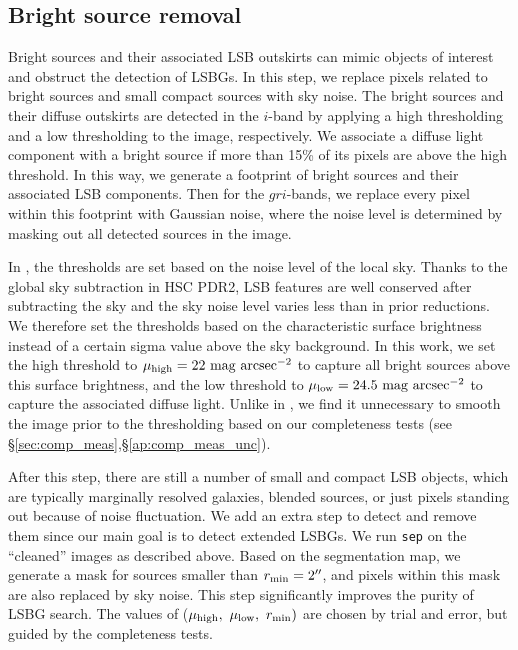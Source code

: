 \documentclass[twocolumn,astrosymb,twocolappendix]{aastex631}
\newcommand{\sbunit}{\mathrm{mag\ arcsec}^{-2}}
\newcommand{\code}[1]{\texttt{#1}}
\begin{document}
\begin{CJK*}{UTF8}{gbsn}
\subsection{Bright source removal}
Bright sources and their associated LSB outskirts can mimic objects of interest and obstruct the detection of LSBGs. In this step, we replace pixels related to bright sources and small compact sources with sky noise. The bright sources and their diffuse outskirts are detected in the $i$-band by applying a high thresholding and a low thresholding to the image, respectively. We associate a diffuse light component with a bright source if more than 15\% of its pixels are above the high threshold. In this way, we generate a footprint of bright sources and their associated LSB components. Then for the $gri$-bands, we replace every pixel within this footprint with Gaussian noise, where the noise level is determined by masking out all detected sources in the image. 
    
In , the thresholds are set based on the noise level of the local sky. Thanks to the global sky subtraction in HSC PDR2, LSB features are well conserved after subtracting the sky and the sky noise level varies less than in prior reductions. We therefore set the thresholds based on the characteristic surface brightness instead of a certain sigma value above the sky background. In this work, we set the high threshold to $\mu_{\rm high} = 22\ \sbunit$ to capture all bright sources above this surface brightness, and the low threshold to $\mu_{\rm low} = 24.5\ \sbunit$ to capture the associated diffuse light. Unlike in , we find it unnecessary to smooth the image prior to the thresholding based on our completeness tests (see \S \ref{sec:comp_meas},\S\ref{ap:comp_meas_unc}).   

After this step, there are still a number of small and compact LSB objects, which are typically marginally resolved galaxies, blended sources, or just pixels standing out because of noise fluctuation. We add an extra step to detect and remove them since our main goal is to detect extended LSBGs. We run \code{sep} on the ``cleaned'' images as described above. Based on the segmentation map, we generate a mask for sources smaller than $r_{\rm min} = 2\mbox{$^{\prime\prime}$}$, and pixels within this mask are also replaced by sky noise. This step significantly improves the purity of LSBG search. The values of ($\mu_{\rm high},\ \mu_{\rm low},\ r_{\rm min})$ are chosen by trial and error, but guided by the completeness tests. 
    

\end{CJK*}
\end{document}

